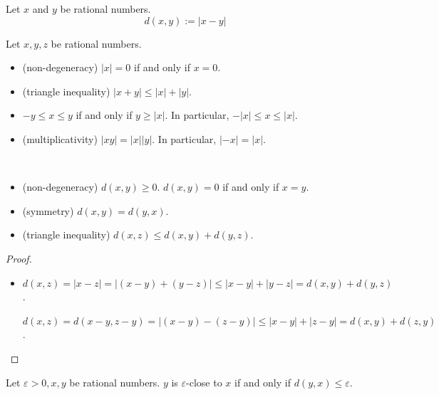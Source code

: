 \documentclass{blog}
\begin{document}
\begin{definition}[distance]
  Let $x$ and $y$ be rational numbers.
  \begin{equation}
    d(x, y) := |x - y|
  \end{equation}
\end{definition}

\begin{proposition}
  Let $x, y, z$ be rational numbers.
  \begin{itemize}
  \item (non-degeneracy) $|x| = 0$ if and only if $x = 0$.
  \item (triangle inequality) $|x + y| \leq |x| + |y|$.
  \item $-y \leq x \leq y$ if and only if $y \geq |x|$.
    In particular, $-|x| \leq x \leq |x|$.
  \item (multiplicativity) $|x y| = |x| |y|$.
    In particular, $|-x| = |x|$.
  \end{itemize}
\end{proposition}

\begin{proposition}~
  \begin{itemize}
  \item (non-degeneracy) $d(x, y) \geq 0$.
    $d(x, y) = 0$ if and only if $x = y$.
  \item (symmetry) $d(x, y) = d(y, x)$.
  \item (triangle inequality) $d(x, z) \leq d(x, y) + d(y, z)$.
  \end{itemize}
\end{proposition}

\begin{proof}~
  \begin{itemize}
  \item $d(x, z) = |x - z| = |(x - y) + (y - z)| \leq |x - y| + |y - z| = d(x, y) + d(y, z)$.

    $d(x, z) = d(x - y, z - y) = |(x - y) - (z - y)| \leq |x - y| + |z - y| = d(x, y) + d(z, y)$.
  \end{itemize}
\end{proof}

\begin{definition}
  Let $\varepsilon > 0, x, y$ be rational numbers.
  $y$ is $\varepsilon$-close to $x$ if and only if $d(y, x) \leq \varepsilon$.
\end{definition}
\end{document}
